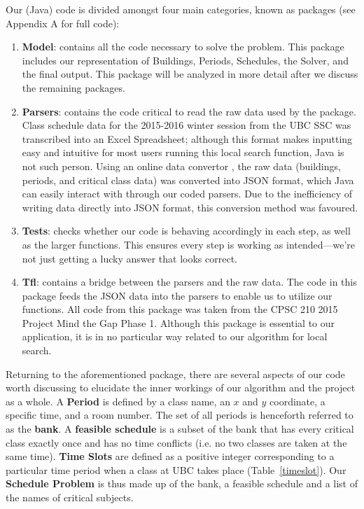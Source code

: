 \documentclass[11pt, oneside]{article}   	%
\begin{document}
Our (Java) code is divided amongst four main categories, known as packages (see Appendix A for full code):


\begin{enumerate}
\item \textbf{Model}: contains all the code necessary to solve the problem. This package includes our representation of Buildings, Periods, Schedules, the Solver, and the final output. This package will be analyzed in more detail after we discuss the remaining packages.


\item \textbf{Parsers}: contains the code critical to read the raw data used by the  package. Class schedule data for the 2015-2016 winter session from the UBC SSC was transcribed into an Excel Spreadsheet; although this format makes inputting easy and intuitive for most users running this local search function, Java is not such person. Using an online data convertor \cite{ref:convert}, the raw data (buildings, periods, and critical class data) was converted into JSON format, which Java can easily interact with through our coded parsers.  Due to the inefficiency of writing data directly into JSON format, this conversion method was favoured.

\item \textbf{Tests}: checks whether our code is behaving accordingly in each step, as well as the larger functions. This ensures every step is working as intended---we're not just getting a lucky answer that looks correct. 

\item \textbf{Tfl}: contains a bridge between the parsers and the raw data. The code in this package feeds the JSON data into the parsers to enable us to utilize our functions. All code from this package was taken from the CPSC 210 2015 Project Mind the Gap Phase 1. Although this package is essential to our application, it is in no particular way related to our algorithm for local search.
\end{enumerate}

Returning to the aforementioned  package, there are several aspects of our code worth discussing to elucidate the inner workings of our algorithm and the project as a whole. A \textbf{Period} is defined by a class name, an $x$ and $y$ coordinate, a specific time, and a room number. The set of all periods is henceforth referred to as the \textbf{bank}. A \textbf{feasible schedule} is a subset of the bank that has every critical class exactly once and has no time conflicts (i.e. no two classes are taken at the same time). \textbf{Time Slots} are defined as a positive integer corresponding to a particular time period when a class at UBC takes place (Table~\ref{timeslot}). Our \textbf{Schedule Problem} is thus made up of the bank, a feasible schedule and a list of the names of critical subjects. 
\end{document}
